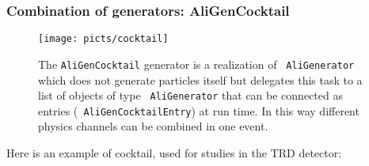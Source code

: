 \documentclass[12pt,a4paper,twoside]{article}
\begin{document}
\subsubsection{Combination of generators: AliGenCocktail}

\begin{figure}[ht]
  \centering
  \texttt{[image: picts/cocktail]}
  \caption{The \texttt{AliGenCocktail} generator is a realization of {\tt
      AliGenerator} which does not generate particles itself but
    delegates this task to a list of objects of type {\tt
      AliGenerator} that can be connected as entries ({\tt
      AliGenCocktailEntry}) at run time. In this way different physics
    channels can be combined in one event.} \label{MC:cocktail}
\end{figure}

Here is an example of cocktail, used for studies in the TRD detector:
\end{document}

